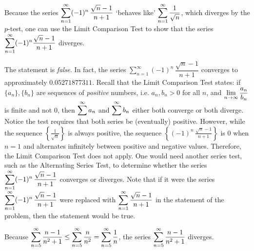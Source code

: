 \documentclass[11pt,letterpaper]{article}
\begin{document}
 Because the series $\displaystyle\sum_{n=1}^\infty (-1)^n\, \dfrac{\sqrt{n} - 1}{n + 1}$ `behaves like' $\displaystyle\sum_{n=1}^\infty \dfrac{1}{\sqrt{n}}$, which diverges by the $p$-test, one can use the Limit Comparison Test to show that the series $\displaystyle\sum_{n=1}^\infty (-1)^n \dfrac{\sqrt{n} - 1}{n + 1}$ diverges. \pspace

\sol The statement is \textit{false}. In fact, the series $\sum_{n=1}^\infty (-1)^n\, \dfrac{\sqrt{n} - 1}{n + 1}$ converges to approximately $0.05271877311$. Recall that the Limit Comparison Test states: if $\{a_n \}, \{ b_n \}$ are sequences of \textit{positive} numbers, i.e. $a_n, b_n > 0$ for all $n$, and $\displaystyle\lim_{n \to \infty} \frac{a_n}{b_n}$ is finite and not 0, then $\displaystyle\sum^\infty a_n$ and $\displaystyle\sum^\infty b_n$ either both converge or both diverge. Notice the test requires that both series be (eventually) positive. However, while the sequence $\left\{ \frac{1}{\sqrt{n}} \right\}$ is always positive, the sequence $\left\{ (-1)^n \, \frac{\sqrt{n} - 1}{n + 1} \right\}$ is 0 when $n= 1$ and alternates infinitely between positive and negative values. Therefore, the Limit Comparison Test does not apply. One would need another series test, such as the Alternating Series Test, to determine whether the series $\displaystyle\sum_{n=1}^\infty (-1)^n\, \dfrac{\sqrt{n} - 1}{n + 1}$ converges or diverges. Note that if it were the series $\displaystyle\sum_{n=1}^\infty (-1)^n\, \dfrac{\sqrt{n} - 1}{n + 1}$ were replaced with $\displaystyle\sum_{n=1}^\infty \dfrac{\sqrt{n} - 1}{n + 1}$ in the statement of the problem, then the statement would be true. \pvspace{1.3cm}



 Because $\displaystyle\sum_{n=5}^\infty \dfrac{n - 1}{n^2 + 1} \leq \sum_{n=5}^\infty \dfrac{n}{n^2}= \sum_{n=5}^\infty \dfrac{1}{n}$, the series $\displaystyle\sum_{n=5}^\infty \dfrac{n - 1}{n^2 + 1}$ diverges. \pspace
\end{document}

